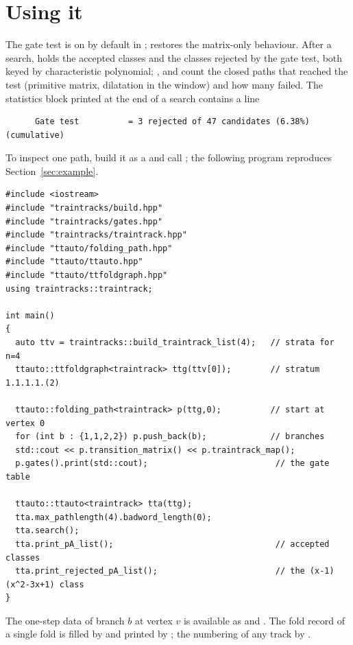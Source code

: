 \documentclass[12pt]{amsart}
\theoremstyle{plain}
\theoremstyle{definition}
\begin{document}

\section{Using it}
\label{sec:api}

The gate test is on by default in ;
 restores the matrix-only behaviour.  After a
search,  holds the accepted classes and
 the classes rejected by the gate test, both
keyed by characteristic polynomial; ,
 and  count the
closed paths that reached the test (primitive matrix, dilatation in the
window) and how many failed.  The statistics block printed at the end of
a search contains a line
{\footnotesize
\begin{verbatim}
      Gate test          = 3 rejected of 47 candidates (6.38%) (cumulative)
\end{verbatim}}
To inspect one path, build it as a  and call
; the following program reproduces
Section~\ref{sec:example}.
{\footnotesize
\begin{verbatim}
#include <iostream>
#include "traintracks/build.hpp"
#include "traintracks/gates.hpp"
#include "traintracks/traintrack.hpp"
#include "ttauto/folding_path.hpp"
#include "ttauto/ttauto.hpp"
#include "ttauto/ttfoldgraph.hpp"
using traintracks::traintrack;

int main()
{
  auto ttv = traintracks::build_traintrack_list(4);   // strata for n=4
  ttauto::ttfoldgraph<traintrack> ttg(ttv[0]);        // stratum 1.1.1.1.(2)

  ttauto::folding_path<traintrack> p(ttg,0);          // start at vertex 0
  for (int b : {1,1,2,2}) p.push_back(b);             // branches
  std::cout << p.transition_matrix() << p.traintrack_map();
  p.gates().print(std::cout);                          // the gate table

  ttauto::ttauto<traintrack> tta(ttg);
  tta.max_pathlength(4).badword_length(0);
  tta.search();
  tta.print_pA_list();                                 // accepted classes
  tta.print_rejected_pA_list();                        // the (x-1)(x^2-3x+1) class
}
\end{verbatim}}
The one-step data of branch $b$ at vertex $v$ is available as
 and .
The fold record of a single fold is filled by
 and printed by ;
the numbering of any track by .
\end{document}
